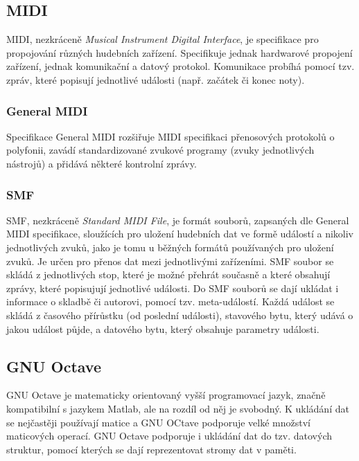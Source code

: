 \documentclass[12pt,a4paper,titlepage]{article}
\begin{document}
\subsection{MIDI}
MIDI, nezkráceně \emph{Musical Instrument Digital Interface}, je specifikace pro propojování různých hudebních zařízení. Specifikuje jednak hardwarové propojení zařízení, jednak komunikační a datový protokol. Komunikace probíhá pomocí tzv. zpráv, které popisují jednotlivé události (např. začátek či konec noty).
\subsubsection{General MIDI}
Specifikace General MIDI rozšiřuje MIDI specifikaci přenosových protokolů o polyfonii, zavádí standardizované zvukové programy (zvuky jednotlivých nástrojů) a přidává některé kontrolní zprávy.
\subsubsection{SMF}
SMF, nezkráceně \emph{Standard MIDI File}, je formát souborů, zapsaných dle General MIDI specifikace, sloužících pro uložení hudebních dat ve formě událostí a nikoliv jednotlivých zvuků, jako je tomu u běžných formátů používaných pro uložení zvuků. Je určen pro přenos dat mezi jednotlivými zařízeními. SMF soubor se skládá z jednotlivých stop, které je možné přehrát současně a které obsahují zprávy, které popisujují jednotlivé události. Do SMF souborů se dají ukládat i informace o skladbě či autorovi, pomocí tzv. meta-událostí. Každá událost se skládá z časového přírůstku (od poslední události), stavového bytu, který udává o jakou událost půjde, a datového bytu, který obsahuje parametry události.
\subsection{GNU Octave}
GNU Octave je matematicky orientovaný vyšší programovací jazyk, značně kompatibilní s jazykem Matlab, ale na rozdíl od něj je svobodný. K ukládání dat se nejčastěji používají matice a GNU OCtave podporuje velké množství maticových operací. GNU Octave podporuje i ukládání dat do tzv. datových struktur, pomocí kterých se dají reprezentovat stromy dat v paměti.
\newpage
\end{document}

